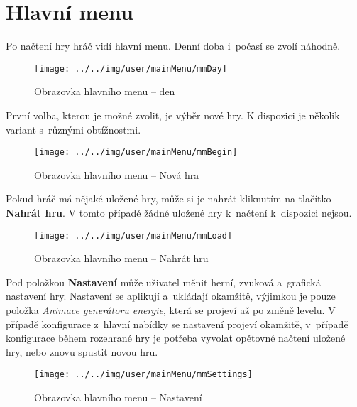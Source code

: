 
\section{Hlavní menu}

Po načtení hry hráč vidí hlavní menu. Denní doba i~počasí se zvolí náhodně.

\begin{figure}[!ht]\centering
\texttt{[image: ../../img/user/mainMenu/mmDay]}

\caption{Obrazovka hlavního menu -- den}
\label{fig:user_mainMenu_mmDay}

\end{figure}


\FloatBarrier

První volba, kterou je možné zvolit, je výběr nové hry. K dispozici je několik variant s~různými obtížnostmi.

\begin{figure}[!ht]\centering
\texttt{[image: ../../img/user/mainMenu/mmBegin]}

\caption{Obrazovka hlavního menu -- Nová hra}
\label{fig:user_mainMenu_mmBegin}

\end{figure}
\FloatBarrier

Pokud hráč má nějaké uložené hry, může si je nahrát kliknutím na tlačítko \textbf{Nahrát hru}. V tomto případě žádné uložené hry k~načtení k~dispozici nejsou.

\begin{figure}[!ht]\centering
\texttt{[image: ../../img/user/mainMenu/mmLoad]}

\caption{Obrazovka hlavního menu -- Nahrát hru}
\label{fig:user_mainMenu_mmLoad}

\end{figure}
\FloatBarrier

Pod položkou \textbf{Nastavení} může uživatel měnit herní, zvuková a~grafická nastavení hry. Nastavení se aplikují a~ukládají okamžitě, výjimkou je pouze položka \textit{Animace generátoru energie}, která se projeví až po změně levelu. V případě konfigurace z~hlavní nabídky se nastavení projeví okamžitě, v~případě konfigurace během rozehrané hry je potřeba vyvolat opětovné načtení uložené hry, nebo znovu spustit novou hru.

\begin{figure}[!ht]\centering
\texttt{[image: ../../img/user/mainMenu/mmSettings]}

\caption{Obrazovka hlavního menu -- Nastavení}
\label{fig:user_mainMenu_mmSettings}

\end{figure}

\FloatBarrier